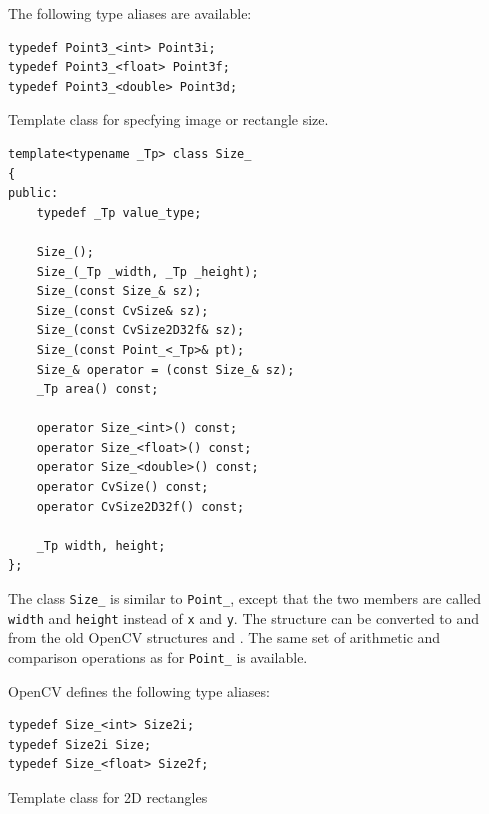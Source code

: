 The following type aliases are available:

\begin{lstlisting}
typedef Point3_<int> Point3i;
typedef Point3_<float> Point3f;
typedef Point3_<double> Point3d;
\end{lstlisting}


Template class for specfying image or rectangle size.

\begin{lstlisting}
template<typename _Tp> class Size_
{
public:
    typedef _Tp value_type;
    
    Size_();
    Size_(_Tp _width, _Tp _height);
    Size_(const Size_& sz);
    Size_(const CvSize& sz);
    Size_(const CvSize2D32f& sz);
    Size_(const Point_<_Tp>& pt);
    Size_& operator = (const Size_& sz);
    _Tp area() const;

    operator Size_<int>() const;
    operator Size_<float>() const;
    operator Size_<double>() const;
    operator CvSize() const;
    operator CvSize2D32f() const;

    _Tp width, height;
};
\end{lstlisting}

The class \texttt{Size\_} is similar to \texttt{Point\_}, except that the two members are called \texttt{width} and \texttt{height} instead of \texttt{x} and \texttt{y}. The structure can be converted to and from the old OpenCV structures  and . The same set of arithmetic and comparison operations as for \texttt{Point\_} is available. 

OpenCV defines the following type aliases:

\begin{lstlisting}
typedef Size_<int> Size2i;
typedef Size2i Size;
typedef Size_<float> Size2f;
\end{lstlisting}


Template class for 2D rectangles

